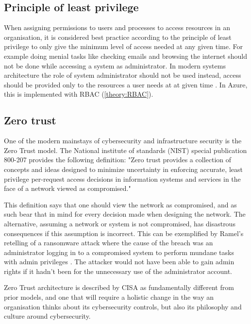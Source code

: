 \subsection{Principle of least privilege}
When assigning permissions to users and processes to access resources in an organisation, it is considered best practice according to the principle of least privilege to only give the minimum level of access needed at any given time. For example doing menial tasks like checking emails and browsing the internet should not be done while accessing a system as administrator. In modern systems architecture the role of system administrator should not be used instead, access should be provided only to the resources a user needs at at given time \cite{ramel_anatomy_nodate}.
In Azure, this is implemented with RBAC (\ref{theory:RBAC}).

\subsection{Zero trust}
One of the modern mainstays of cybersecurity and infrastructure security is the Zero Trust model.
The National institute of standards (NIST) special publication 800-207 provides the following definition: 
"Zero trust provides a collection of concepts and ideas designed to minimize uncertainty in enforcing accurate,
least privilege per-request access decisions in information systems and services in the face of a network viewed as compromised." 
\cite{cybersecurity_and_infrastructure_security_agency_cisa_2021} 

This definition says that one should view the network as compromised,
and as such bear that in mind for every decision made when designing the network.
The alternative, assuming a network or system is not compromised,
has disastrous consequences if this assumption is incorrect.
This can be exemplified by Ramel's retelling of a ransomware attack where the cause of the breach was an administrator logging in to a compromised system to perform mundane tasks with admin privileges \cite{ramel_anatomy_nodate}. The attacker would not have been able to gain admin rights if it hadn't been for the unnecessary use of the administrator account. \label{ZeroTrust}

Zero Trust architecture is described by CISA as fundamentally different from prior models,
and one that will require a holistic change in the way an organisation thinks about its cybersecurity controls,
but also its philosophy and culture around cybersecurity. 


